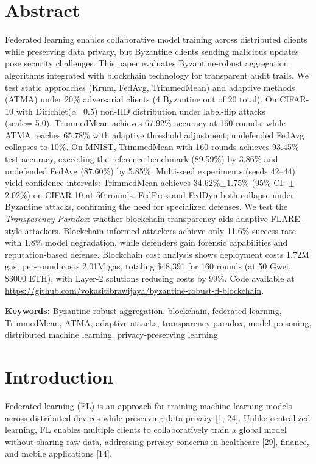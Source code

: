 \documentclass[12pt,a4paper,onecolumn]{article}
\begin{document}
\section*{Abstract}
Federated learning enables collaborative model training across distributed clients while preserving data privacy, but Byzantine clients sending malicious updates pose security challenges. This paper evaluates Byzantine-robust aggregation algorithms integrated with blockchain technology for transparent audit trails. We test static approaches (Krum, FedAvg, TrimmedMean) and adaptive methods (ATMA) under 20\% adversarial clients (4 Byzantine out of 20 total). On CIFAR-10 with Dirichlet($\alpha$=0.5) non-IID distribution under label-flip attacks (scale=-5.0), TrimmedMean achieves 67.92\% accuracy at 160 rounds, while ATMA reaches 65.78\% with adaptive threshold adjustment; undefended FedAvg collapses to 10\%. On MNIST, TrimmedMean with 160 rounds achieves 93.45\% test accuracy, exceeding the reference benchmark (89.59\%) by 3.86\% and undefended FedAvg (87.60\%) by 5.85\%. Multi-seed experiments (seeds 42--44) yield confidence intervals: TrimmedMean achieves 34.62\%$\pm$1.75\% (95\% CI: $\pm$2.02\%) on CIFAR-10 at 50 rounds. FedProx and FedDyn both collapse under Byzantine attacks, confirming the need for specialized defenses. We test the \emph{Transparency Paradox}: whether blockchain transparency aids adaptive FLARE-style attackers. Blockchain-informed attackers achieve only 11.6\% success rate with 1.8\% model degradation, while defenders gain forensic capabilities and reputation-based defense. Blockchain cost analysis shows deployment costs 1.72M gas, per-round costs 2.01M gas, totaling \$48,391 for 160 rounds (at 50 Gwei, \$3000 ETH), with Layer-2 solutions reducing costs by 99\%. Code available at \url{https://github.com/vokasitibrawijaya/byzantine-robust-fl-blockchain}.

\noindent\textbf{Keywords:} Byzantine-robust aggregation, blockchain, federated learning, TrimmedMean, ATMA, adaptive attacks, transparency paradox, model poisoning, distributed machine learning, privacy-preserving learning

\section{Introduction}
\label{sec:introduction}

Federated learning (FL) is an approach for training machine learning models across distributed devices while preserving data privacy [1, 24]. Unlike centralized learning, FL enables multiple clients to collaboratively train a global model without sharing raw data, addressing privacy concerns in healthcare [29], finance, and mobile applications [14].
\end{document}
